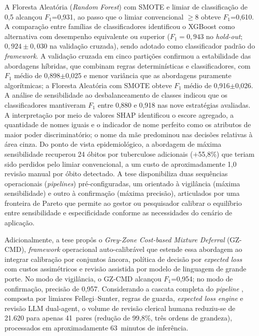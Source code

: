 \documentclass[12pt,a4paper,openany]{book}
\begin{document}
A Floresta Aleatória (\textit{Random Forest}) com SMOTE e limiar de classificação de 0,5 alcançou $F_1$=0,931, ao passo que o limiar convencional $\geq$8 obteve $F_1$=0,610. A comparação entre famílias de classificadores identificou o XGBoost como alternativa com desempenho equivalente ou superior ($F_1 = 0{,}943$ no \textit{hold-out}; $0{,}924 \pm 0{,}030$ na validação cruzada), sendo adotado como classificador padrão do \textit{framework}.
A validação cruzada em cinco partições confirmou a estabilidade das abordagens híbridas, que combinam regras determinísticas e classificadores, com $F_1$ médio de 0,898$\pm$0,025 e menor variância que as abordagens puramente algorítmicas; a Floresta Aleatória com SMOTE obteve $F_1$ médio de 0,916$\pm$0,026.
A análise de sensibilidade ao desbalanceamento de classes indicou que os classificadores mantiveram $F_1$ entre 0,880 e 0,918 nas nove estratégias avaliadas.
A interpretação por meio de valores SHAP identificou o escore agregado, a quantidade de nomes iguais e o indicador de nome perfeito como os atributos de maior poder discriminatório; o nome da mãe predominou nas decisões relativas à área cinza.
Do ponto de vista epidemiológico, a abordagem de máxima sensibilidade recuperou 24 óbitos por tuberculose adicionais ($+$55,8\%) que teriam sido perdidos pelo limiar convencional, a um custo de aproximadamente 1,0 revisão manual por óbito detectado. A tese disponibiliza duas sequências operacionais (\textit{pipelines}) pré-configuradas, um orientado à vigilância (máxima sensibilidade) e outro à confirmação (máxima precisão), articulados por uma fronteira de Pareto que permite ao gestor ou pesquisador calibrar o equilíbrio entre sensibilidade e especificidade conforme as necessidades do cenário de aplicação.

Adicionalmente, a tese propôs o \textit{Grey-Zone Cost-based Mixture Deferral} (GZ-CMD), \textit{framework} operacional auto-calibrável que estende essa abordagem ao integrar calibração por conjuntos âncora, política de decisão por \textit{expected loss} com custos assimétricos e revisão assistida por modelo de linguagem de grande porte. No modo de vigilância, o GZ-CMD alcançou $F_1$=0,954; no modo de confirmação, precisão de 0,957. Considerando a cascata completa do \textit{pipeline} , composta por limiares Fellegi--Sunter, regras de guarda, \textit{expected loss engine} e revisão LLM dual-agent, o volume de revisão clerical humana reduziu-se de 21.620 para apenas 41~pares (redução de 99,8\%, três ordens de grandeza), processados em aproximadamente 63~minutos de inferência.
\end{document}
